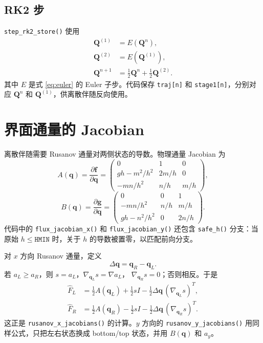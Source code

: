 \documentclass[12pt,a4paper]{article}
\begin{document}
\subsection{RK2 步}

\texttt{step\_rk2\_store()} 使用
\begin{align}
\mathbf{Q}^{(1)} &= E(\mathbf{Q}^n),\\
\mathbf{Q}^{(2)} &= E(\mathbf{Q}^{(1)}),\\
\mathbf{Q}^{n+1} &= \frac12\mathbf{Q}^{n}+\frac12\mathbf{Q}^{(2)}.
\label{eq:rk2}
\end{align}
其中 $E$ 是式 \eqref{eq:euler} 的 Euler 子步。代码保存
\texttt{traj[n]} 和 \texttt{stage1[n]}，分别对应 $\mathbf{Q}^n$ 和
$\mathbf{Q}^{(1)}$，供离散伴随反向使用。

\section{界面通量的 Jacobian}

离散伴随需要 Rusanov 通量对两侧状态的导数。物理通量 Jacobian 为
\begin{equation}
A(\mathbf{q})=\frac{\partial\mathbf{f}}{\partial\mathbf{q}}
=
\begin{pmatrix}
0 & 1 & 0\\
gh-m^2/h^2 & 2m/h & 0\\
-mn/h^2 & n/h & m/h
\end{pmatrix},
\label{eq:Ax}
\end{equation}
\begin{equation}
B(\mathbf{q})=\frac{\partial\mathbf{g}}{\partial\mathbf{q}}
=
\begin{pmatrix}
0 & 0 & 1\\
-mn/h^2 & n/h & m/h\\
gh-n^2/h^2 & 0 & 2n/h
\end{pmatrix}.
\label{eq:Ay}
\end{equation}
代码中的 \texttt{flux\_jacobian\_x()} 和 \texttt{flux\_jacobian\_y()}
还包含 \texttt{safe\_h()} 分支：当原始 $h\le\mathtt{HMIN}$ 时，关于
$h$ 的导数被置零，以匹配前向分支。

对 $x$ 方向 Rusanov 通量，定义
\[
\Delta\mathbf{q}=\mathbf{q}_R-\mathbf{q}_L.
\]
若 $a_L\ge a_R$，则 $s=a_L$，$\nabla_{\mathbf{q}_L}s=\nabla a_L$，
$\nabla_{\mathbf{q}_R}s=0$；否则相反。于是
\begin{align}
\widehat{F}_L
&=
\frac12 A(\mathbf{q}_L)+\frac12sI
-\frac12\Delta\mathbf{q}\,(\nabla_{\mathbf{q}_L}s)^{T},
\label{eq:FL}\\
\widehat{F}_R
&=
\frac12 A(\mathbf{q}_R)-\frac12sI
-\frac12\Delta\mathbf{q}\,(\nabla_{\mathbf{q}_R}s)^{T}.
\label{eq:FR}
\end{align}
这正是 \texttt{rusanov\_x\_jacobians()} 的计算。$y$ 方向的
\texttt{rusanov\_y\_jacobians()} 用同样公式，只把左右状态换成
bottom/top 状态，并用 $B(\mathbf{q})$ 和 $a_y$。
\end{document}
